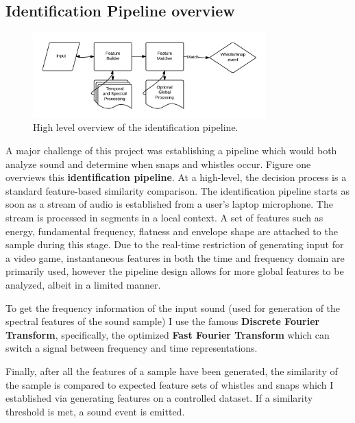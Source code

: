 \documentclass[DIV=calc, paper=a4, fontsize=11pt, twocolumn]{scrartcl}   %
\begin{document}
\subsection{Identification Pipeline overview}
\begin{figure}[h]
\centering
\includegraphics[width=90mm]{figures/HighLevelPipeline.png}
\caption{High level overview of the identification pipeline.}
\label{overflow}
\end{figure}
A major challenge of this project was establishing a pipeline which would both analyze sound and determine when snaps and whistles occur. Figure one overviews this \textbf{identification pipeline}. At a high-level, the decision process is a standard feature-based similarity comparison. The identification pipeline starts as soon as a stream of audio is established from a user's laptop microphone. The stream is processed in segments in a local context. A set of features such as energy, fundamental frequency, flatness and envelope shape are attached to the sample during this stage. Due to the real-time restriction of generating input for a video game, instantaneous features in both the time and frequency domain are primarily used, however the pipeline design allows for more global features to be analyzed, albeit in a limited manner.
\par To get the frequency information of the input sound (used for generation of the spectral features of the sound sample) I use the famous \textbf{Discrete Fourier Transform}, specifically,  the optimized \textbf{Fast Fourier Transform}  which can switch a signal between frequency and time representations.
\par Finally, after all the features of a sample have been generated, the similarity of the sample is compared to expected feature sets of whistles and snaps which I established via generating features on a controlled dataset. If a similarity threshold is met, a sound event is emitted.






\end{document}
